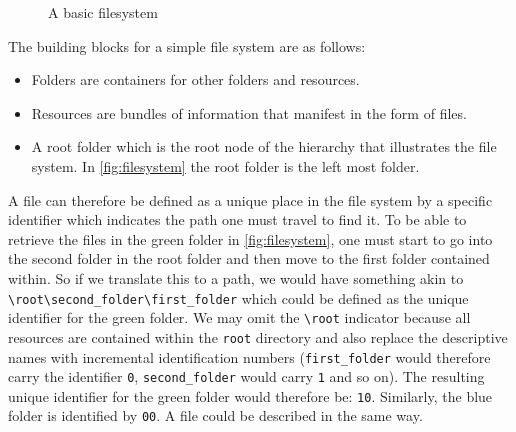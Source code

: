 \begin{minipage}{1\textwidth}
    \begin{figure}[H]
        \centering
        
        \caption{\label{fig:filesystem} A basic filesystem }
    \end{figure}
\end{minipage}

The building blocks for a simple file system are as follows:
\begin{itemize}
    \item Folders are containers for other folders and resources.
    \item Resources are bundles of information that manifest in the form of files.
    \item A root folder which is the root node of the hierarchy that illustrates the file system. In \autoref{fig:filesystem} the root folder is the left most folder.
\end{itemize}

A file can therefore be defined as a unique place in the file system by a specific identifier which indicates the path one must travel to find it. To be able to retrieve the files in the green folder in \autoref{fig:filesystem}, one must start to go into the second folder in the root folder and then move to the first folder contained within. So if we translate this to a path, we would have something akin to \lstinline{\root\second_folder\first_folder} which could be defined as the unique identifier for the green folder. We may omit the \lstinline{\root} indicator because all resources are contained within the \lstinline{root} directory and also replace the descriptive names with incremental identification numbers (\lstinline{first_folder} would therefore carry the identifier \lstinline{0}, \lstinline{second_folder} would carry \lstinline{1} and so on). The resulting unique identifier for the green folder would therefore be: \lstinline{10}. Similarly, the blue folder is identified by \lstinline{00}. A file could be described in the same way.
